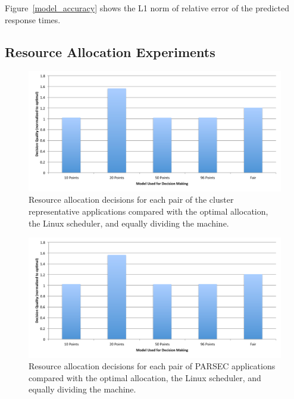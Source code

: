 Figure~\ref{model_accuracy} shows the L1 norm of relative error of the predicted response times.

\subsection*{Resource Allocation Experiments}
\begin{figure}[!t]
	\begin{center}	
		\includegraphics[width=0.9\columnwidth]{decision_quality.pdf}
		\caption{Resource allocation decisions for each pair of the cluster representative applications compared with the optimal allocation, the Linux scheduler, and equally dividing the machine.}
		\label{cluster_decision_quality}
	\end{center}
\end{figure}

\begin{figure}[!t]
	\begin{center}	
		\includegraphics[width=0.9\columnwidth]{decision_quality.pdf}
		\caption{Resource allocation decisions for each pair of PARSEC applications compared with the optimal allocation, the Linux scheduler, and equally dividing the machine.}
		\label{parsec_decision_quality}
	\end{center}
\end{figure}

